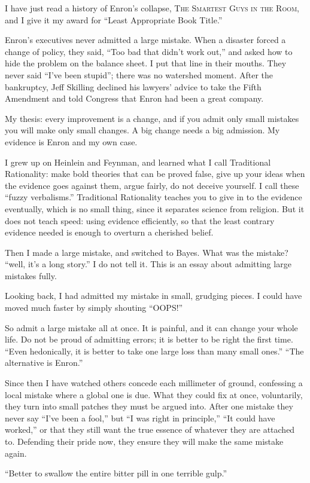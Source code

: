 
I have just read a history of Enron's collapse, \textsc{The Smartest Guys in the Room}, and I give it my award for ``Least Appropriate Book Title.''

Enron's executives never admitted a large mistake. When a disaster forced a change of policy, they said, ``Too bad that didn't work out,'' and asked how to hide the problem on the balance sheet. I put that line in their mouths. They never said ``I've been stupid''; there was no watershed moment. After the bankruptcy, Jeff Skilling declined his lawyers' advice to take the Fifth Amendment and told Congress that Enron had been a great company. 

My thesis: every improvement is a change, and if you admit only small mistakes you will make only small changes. A big change needs a big admission. My evidence is Enron and my own case. 

I grew up on Heinlein and Feynman, and learned what I call Traditional Rationality: make bold theories that can be proved false, give up your ideas when the evidence goes against them, argue fairly, do not deceive yourself. I call these ``fuzzy verbalisms.'' Traditional Rationality teaches you to give in to the evidence eventually, which is no small thing, since it separates science from religion. But it does not teach speed: using evidence efficiently, so that the least contrary evidence needed is enough to overturn a cherished belief.

Then I made a large mistake, and switched to Bayes. What was the mistake? ``well, it's a long story.'' I do not tell it. This is an essay about admitting large mistakes fully.

Looking back, I had admitted my mistake in small, grudging pieces. I could have moved much faster by simply shouting ``OOPS!''

So admit a large mistake all at once. It is painful, and it can change your whole life. Do not be proud of admitting errors; it is better to be right the first time. ``Even hedonically, it is better to take one large loss than many small ones.'' ``The alternative is Enron.''

Since then I have watched others concede each millimeter of ground, confessing a local mistake where a global one is due. What they could fix at once, voluntarily, they turn into small patches they must be argued into. After one mistake they never say ``I've been a fool,'' but ``I was right in principle,'' ``It could have worked,'' or that they still want the true essence of whatever they are attached to. Defending their pride now, they ensure they will make the same mistake again.

``Better to swallow the entire bitter pill in one terrible gulp.''
